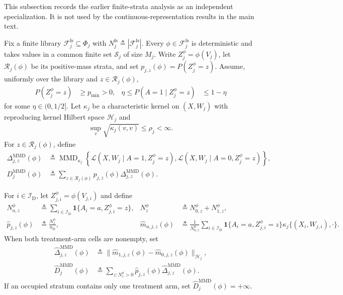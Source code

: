 This subsection records the earlier finite-strata analysis as an independent specialization. It is not used by the continuous-representation results in the main text.

Fix a finite library $\mathcal F_j^{\mathrm{fs}}\subseteq\Phi_j$ with $N_j^{\mathrm{fs}}\triangleq|\mathcal F_j^{\mathrm{fs}}|$. Every $\phi\in\mathcal F_j^{\mathrm{fs}}$ is deterministic and takes values in a common finite set $\mathcal S_j$ of size $M_j$. Write $Z_j^\phi=\phi(V_j)$, let $\mathcal R_j(\phi)$ be its positive-mass strata, and set $p_{j,z}(\phi)=P(Z_j^\phi=z)$. Assume, uniformly over the library and $z\in\mathcal R_j(\phi)$,
\begin{align}
P(Z_j^\phi=z)&\ge p_{\min}>0,
&
\eta\le P(A=1\mid Z_j^\phi=z)&\le1-\eta
\label{eq:finite-mmd-mass-overlap}
\end{align}
for some $\eta\in(0,1/2]$. Let $\kappa_j$ be a characteristic kernel on $(X,W_j)$ with reproducing kernel Hilbert space $\mathcal H_j$ and
\begin{align}
\sup_v\sqrt{\kappa_j(v,v)}\le\rho_j<\infty.
\label{eq:finite-mmd-kernel-bound}
\end{align}
For $z\in\mathcal R_j(\phi)$, define
\begin{align}
\Delta_{j,z}^{\mathrm{MMD}}(\phi)
&\triangleq
\operatorname{MMD}_{\kappa_j}
\left\{
\mathcal L(X,W_j\mid A=1,Z_j^\phi=z),
\mathcal L(X,W_j\mid A=0,Z_j^\phi=z)
\right\},\\
D_j^{\mathrm{MMD}}(\phi)
&\triangleq
\sum_{z\in\mathcal R_j(\phi)}
p_{j,z}(\phi)\Delta_{j,z}^{\mathrm{MMD}}(\phi).
\label{eq:finite-mmd-population-discrepancy}
\end{align}

For $i\in\mathcal I_{\mathrm D}$, let $Z_{j,i}^\phi=\phi(V_{j,i})$ and define
\begin{align}
N_{a,z}^\phi
&\triangleq
\sum_{i\in\mathcal I_{\mathrm D}}
\mathbf 1\{A_i=a,Z_{j,i}^\phi=z\},
&
N_z^\phi&\triangleq N_{0,z}^\phi+N_{1,z}^\phi,\\
\widehat p_{j,z}(\phi)&\triangleq\frac{N_z^\phi}{n_{\mathrm D}},
&
\widehat m_{a,j,z}(\phi)
&\triangleq
\frac{1}{N_{a,z}^\phi}
\sum_{i\in\mathcal I_{\mathrm D}}
\mathbf 1\{A_i=a,Z_{j,i}^\phi=z\}
\kappa_j\{(X_i,W_{j,i}),\cdot\}.
\end{align}
When both treatment-arm cells are nonempty, set
\begin{align}
\widehat\Delta_{j,z}^{\mathrm{MMD}}(\phi)
&\triangleq
\|\widehat m_{1,j,z}(\phi)-\widehat m_{0,j,z}(\phi)\|_{\mathcal H_j},\\
\widehat D_j^{\mathrm{MMD}}(\phi)
&\triangleq
\sum_{z:N_z^\phi>0}
\widehat p_{j,z}(\phi)\widehat\Delta_{j,z}^{\mathrm{MMD}}(\phi).
\label{eq:finite-mmd-empirical-discrepancy}
\end{align}
If an occupied stratum contains only one treatment arm, set $\widehat D_j^{\mathrm{MMD}}(\phi)=+\infty$.


